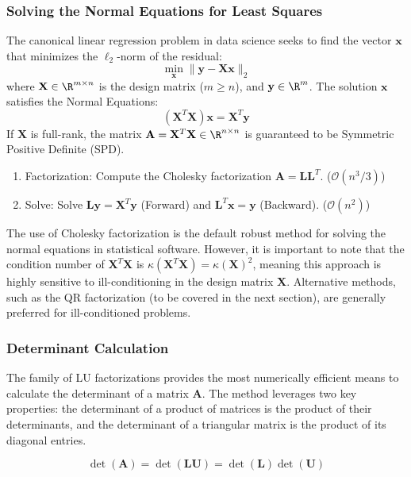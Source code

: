 \subsubsection{Solving the Normal Equations for Least Squares}

The canonical linear regression problem in data science seeks to find the vector $\mathbf{x}$ that minimizes the $\ell_2$-norm of the residual:
\[ \min_{\mathbf{x}} \|\mathbf{y} - \mathbf{X}\mathbf{x}\|_2 \]
where $\mathbf{X} \in \R^{m \times n}$ is the design matrix ($m \ge n$), and $\mathbf{y} \in \R^m$. The solution $\mathbf{x}$ satisfies the Normal Equations:
\[ (\mathbf{X}^T \mathbf{X}) \mathbf{x} = \mathbf{X}^T \mathbf{y} \]
If $\mathbf{X}$ is full-rank, the matrix $\mathbf{A} = \mathbf{X}^T \mathbf{X} \in \R^{n \times n}$ is guaranteed to be Symmetric Positive Definite (SPD).
\begin{enumerate}
    \item Factorization: Compute the Cholesky factorization $\mathbf{A} = \mathbf{L}\mathbf{L}^T$. ($\mathcal{O}(n^3/3)$)
    \item Solve: Solve $\mathbf{L}\mathbf{y} = \mathbf{X}^T \mathbf{y}$ (Forward) and $\mathbf{L}^T \mathbf{x} = \mathbf{y}$ (Backward). ($\mathcal{O}(n^2)$)
\end{enumerate}
The use of Cholesky factorization is the default robust method for solving the normal equations in statistical software. However, it is important to note that the condition number of $\mathbf{X}^T \mathbf{X}$ is $\kappa(\mathbf{X}^T \mathbf{X}) = \kappa(\mathbf{X})^2$, meaning this approach is highly sensitive to ill-conditioning in the design matrix $\mathbf{X}$. Alternative methods, such as the QR factorization (to be covered in the next section), are generally preferred for ill-conditioned problems.

\subsubsection{Determinant Calculation}

The family of LU factorizations provides the most numerically efficient means to calculate the determinant of a matrix $\mathbf{A}$. The method leverages two key properties: the determinant of a product of matrices is the product of their determinants, and the determinant of a triangular matrix is the product of its diagonal entries.

\[ \det(\mathbf{A}) = \det(\mathbf{L}\mathbf{U}) = \det(\mathbf{L})\det(\mathbf{U}) \]

